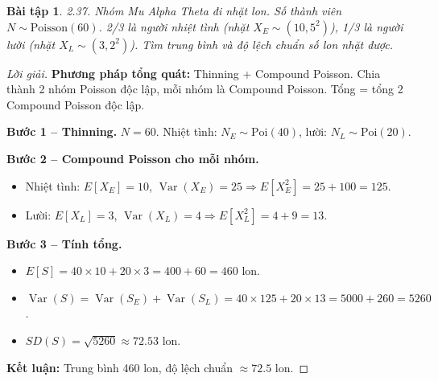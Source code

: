 \documentclass[8pt,a4paper]{article}
\newtheorem{exercise}{Bài tập}
\newenvironment{solution}{\begin{proof}[Lời giải]}{\end{proof}}
\newcommand{\Var}{\operatorname{Var}}
\begin{document}
\begin{exercise}
2.37. Nhóm Mu Alpha Theta đi nhặt lon. Số thành viên $N \sim \text{Poisson}(60)$. 
2/3 là người nhiệt tình (nhặt $X_E \sim (10, 5^2)$), 1/3 là người lười (nhặt $X_L \sim (3, 2^2)$).
Tìm trung bình và độ lệch chuẩn số lon nhặt được.
\end{exercise}
\begin{solution}
\textbf{Phương pháp tổng quát:} Thinning + Compound Poisson. Chia thành 2 nhóm Poisson độc lập, mỗi nhóm là Compound Poisson. Tổng = tổng 2 Compound Poisson độc lập.

\textbf{Bước 1 -- Thinning.} $N = 60$. Nhiệt tình: $N_E \sim \text{Poi}(40)$, lười: $N_L \sim \text{Poi}(20)$.

\textbf{Bước 2 -- Compound Poisson cho mỗi nhóm.}
\begin{itemize}[nosep]
  \item Nhiệt tình: $E[X_E] = 10$, $\Var(X_E) = 25 \Rightarrow E[X_E^2] = 25 + 100 = 125$.
  \item Lười: $E[X_L] = 3$, $\Var(X_L) = 4 \Rightarrow E[X_L^2] = 4 + 9 = 13$.
\end{itemize}

\textbf{Bước 3 -- Tính tổng.}
\begin{itemize}[nosep]
  \item $E[S] = 40 \times 10 + 20 \times 3 = 400 + 60 = \boxed{460}$ lon.
  \item $\Var(S) = \Var(S_E) + \Var(S_L) = 40 \times 125 + 20 \times 13 = 5000 + 260 = 5260$.
  \item $SD(S) = \sqrt{5260} \approx \boxed{72.53}$ lon.
\end{itemize}

\textbf{Kết luận:} Trung bình 460 lon, độ lệch chuẩn $\approx 72.5$ lon.
\end{solution}
\end{document}
